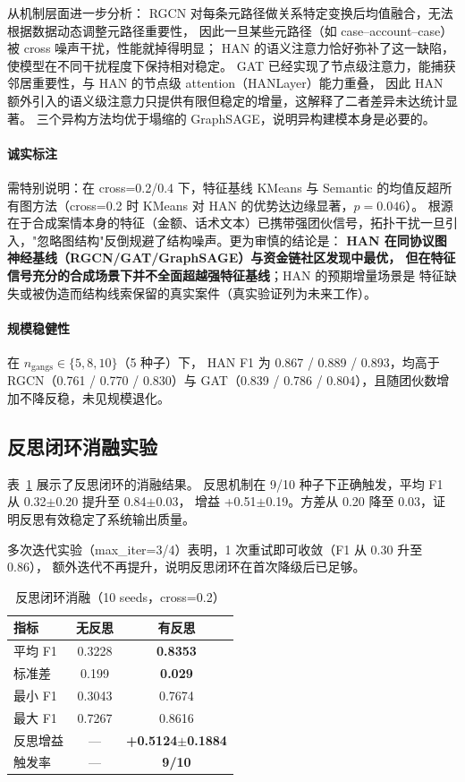 \documentclass[12pt,a4paper]{ctexart}
\begin{document}
从机制层面进一步分析：
RGCN 对每条元路径做关系特定变换后均值融合，无法根据数据动态调整元路径重要性，
因此一旦某些元路径（如 case--account--case）被 cross 噪声干扰，性能就掉得明显；
HAN 的语义注意力恰好弥补了这一缺陷，使模型在不同干扰程度下保持相对稳定。
GAT 已经实现了节点级注意力，能捕获邻居重要性，与 HAN 的节点级 attention（HANLayer）能力重叠，
因此 HAN 额外引入的语义级注意力只提供有限但稳定的增量，这解释了二者差异未达统计显著。
三个异构方法均优于塌缩的 GraphSAGE，说明异构建模本身是必要的。

\paragraph{诚实标注} 需特别说明：在 cross=0.2/0.4 下，特征基线 KMeans 与
Semantic 的均值反超所有图方法（cross=0.2 时 KMeans 对 HAN 的优势达边缘显著，$p=0.046$）。
根源在于合成案情本身的特征（金额、话术文本）已携带强团伙信号，拓扑干扰一旦引入，"忽略图结构"反倒规避了结构噪声。更为审慎的结论是：
\textbf{HAN 在同协议图神经基线（RGCN/GAT/GraphSAGE）与资金链社区发现中最优，
但在特征信号充分的合成场景下并不全面超越强特征基线}；HAN 的预期增量场景是
特征缺失或被伪造而结构线索保留的真实案件（真实验证列为未来工作）。

\paragraph{规模稳健性} 在 $n_{\text{gangs}} \in \{5, 8, 10\}$（5 种子）下，
HAN F1 为 0.867 / 0.889 / 0.893，均高于 RGCN（0.761 / 0.770 / 0.830）与
GAT（0.839 / 0.786 / 0.804），且随团伙数增加不降反稳，未见规模退化。

\subsection{反思闭环消融实验}

表~\ref{tab:reflection} 展示了反思闭环的消融结果。
反思机制在 9/10 种子下正确触发，平均 F1 从 0.32$\pm$0.20 提升至 0.84$\pm$0.03，
增益 +0.51$\pm$0.19。方差从 0.20 降至 0.03，证明反思有效稳定了系统输出质量。

多次迭代实验（max\_iter=3/4）表明，1 次重试即可收敛（F1 从 0.30 升至 0.86），
额外迭代不再提升，说明反思闭环在首次降级后已足够。

\begin{table}[htbp]
  \centering
  \caption{反思闭环消融（10 seeds，cross=0.2）}
  \label{tab:reflection}
  \begin{tabular}{lcc}
    \toprule
    指标 & 无反思 & 有反思 \\
    \midrule
    平均 F1 & 0.3228 & \textbf{0.8353} \\
    标准差 & 0.199 & \textbf{0.029} \\
    最小 F1 & 0.3043 & 0.7674 \\
    最大 F1 & 0.7267 & 0.8616 \\
    反思增益 & — & \textbf{+0.5124$\pm$0.1884} \\
    触发率 & — & \textbf{9/10} \\
    \bottomrule
  \end{tabular}
\end{table}
\end{document}
